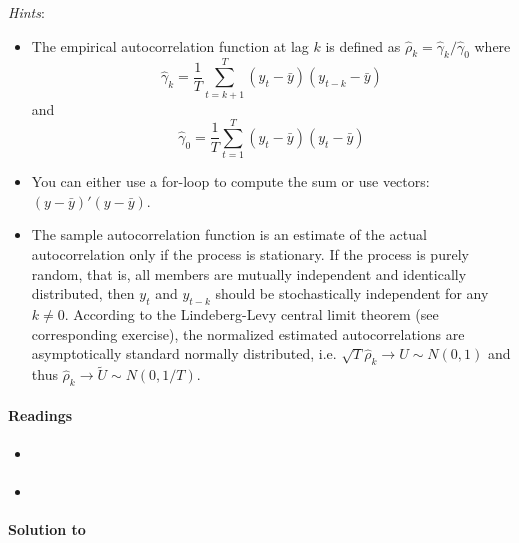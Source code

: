 \begin{enumerate}
\emph{Hints}:
\begin{itemize}
	\item The empirical autocorrelation function at lag \(k\) is defined as \(\hat{\rho}_k = \hat{\gamma}_k/\hat{\gamma}_0\) where
	  \[\hat{\gamma}_k = \frac{1}{T} \sum_{t=k+1}^T (y_t - \bar{y})(y_{t-k}-\bar{y})\] and \[\hat{\gamma}_0 = \frac{1}{T} \sum_{t=1}^T (y_t - \bar{y})(y_{t}-\bar{y})\]
	\item You can either use a for-loop to compute the sum or use vectors: \((y - \bar{y})'(y - \bar{y})\).
	\item The sample autocorrelation function is an estimate of the actual autocorrelation only if the process is stationary.
	If the process is purely random, that is, all members are mutually independent and identically distributed,
	  then \(y_t\) and \(y_{t-k}\) should be stochastically independent for any \(k\neq 0\).
	According to the Lindeberg-Levy central limit theorem (see corresponding exercise),
	  the normalized estimated autocorrelations are asymptotically standard normally distributed,
	  i.e. \(\sqrt{T} \hat{\rho}_k \rightarrow U \sim N(0,1)\) and thus \(\hat{\rho}_k \rightarrow \tilde{U} \sim N(0,1/T)\).
\end{itemize}

\end{enumerate}

\paragraph{Readings}

\begin{itemize}
	\item \textcite[Ch.2]{Bjornland.Thorsrud_2015_AppliedTimeSeries}
	\item \textcite{Lutkepohl_2004_UnivariateTimeSeries}
\end{itemize}

\begin{solution}\textbf{Solution to }
\ifDisplaySolutions

\fi
\newpage
\end{solution}